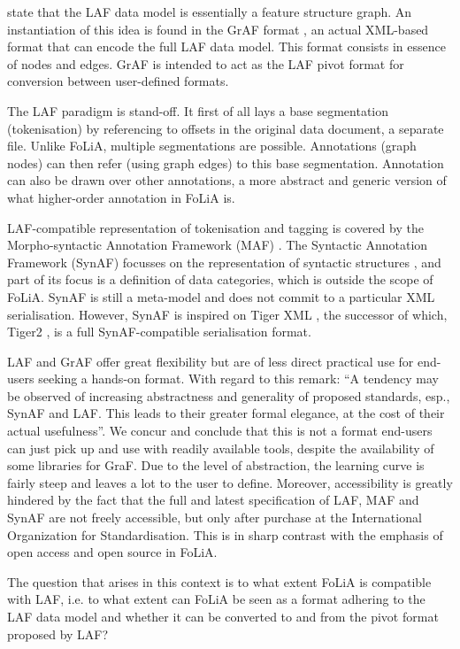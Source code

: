 \documentclass[a4paper,10pt,twoside]{article}
\begin{document}
 state that the LAF data model is essentially a feature
structure graph. An instantiation of this idea is found in the GrAF format
\cite{GRAF}, an actual XML-based format that can encode the full LAF data
model. This format consists in essence of nodes and edges. GrAF is intended to
act as the LAF pivot format for conversion between user-defined formats. 

The LAF paradigm is stand-off. It first of all lays a base segmentation
(tokenisation) by referencing to offsets in the original data document, a
separate file. Unlike FoLiA, multiple segmentations are possible. Annotations
(graph nodes) can then refer (using graph edges) to this base segmentation.
Annotation can also be drawn over other annotations, a more abstract and
generic version of what higher-order annotation in FoLiA is.

LAF-compatible representation of tokenisation and tagging is covered by the
Morpho-syntactic Annotation Framework (MAF) \cite{MAF}. The Syntactic
Annotation Framework (SynAF) focusses on the representation of syntactic
structures \cite{SYNAF}, and part of its focus is a definition of data
categories, which is outside the scope of FoLiA. SynAF is still a meta-model
and does not commit to a particular XML serialisation. However, SynAF is
inspired on Tiger XML \cite{TIGER}, the successor of which, Tiger2
\cite{TIGER2}, is a full SynAF-compatible serialisation format.

LAF and GrAF offer great flexibility but are of less direct practical use for
end-users seeking a hands-on format. With regard to this
 remark: ``A tendency may be observed of increasing
abstractness and generality of proposed standards, esp., SynAF and LAF. This
leads to their greater formal elegance, at the cost of their actual
usefulness''. We concur and conclude that this is not a format end-users can
just pick up and use with readily available tools, despite the availability of
some libraries for GraF. Due to the level of abstraction, the learning curve is
fairly steep and leaves a lot to the user to define. Moreover, accessibility is
greatly hindered by the fact that the full and latest specification of LAF, MAF
and SynAF are not freely accessible, but only after purchase at the International
Organization for Standardisation.  This is in sharp contrast with the emphasis
of open access and open source in FoLiA. 

The question that arises in this context is to what extent FoLiA is compatible
with LAF, i.e. to what extent can FoLiA be seen as a format adhering to the LAF
data model and whether it can be converted to and from the pivot format proposed by LAF?
\end{document}
